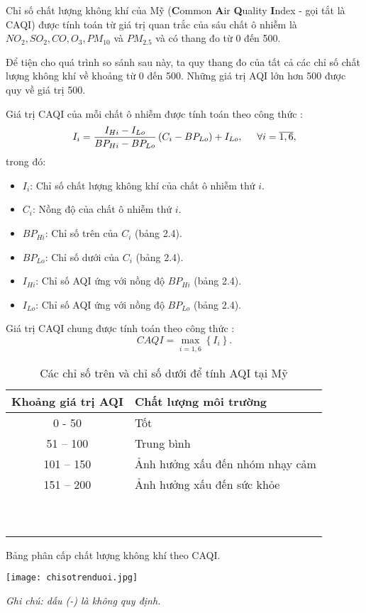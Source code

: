\documentclass[14pt]{extreport}
\theoremstyle{definition}
\theoremstyle{plain}
\theoremstyle{remark}
\begin{document}
Chỉ số chất lượng không khí của Mỹ (\textbf{C}ommon \textbf{A}ir \textbf{Q}uality \textbf{I}ndex - gọi tắt là CAQI) được tính toán từ giá trị quan trắc của sáu chất ô nhiễm là $NO_2, SO_2, CO, O_3, PM_{10}$ và $PM_{2.5}$ và có thang đo từ 0 đến 500. 

Để tiện cho quá trình so sánh sau này, ta quy thang đo của tất cả các chỉ số chất lượng không khí về khoảng từ 0 đến 500. Những giá trị AQI lớn hơn 500 được quy về giá trị 500.

Giá trị CAQI của mỗi chất ô nhiễm được tính toán theo công thức \cite{USEPA2013}:
\begin{equation}
I_i = \dfrac{I_{Hi} - I_{Lo}}{BP_{Hi} - BP_{Lo}}\left(C_i - BP_{Lo}\right) + I_{Lo},\hspace{0.5cm} \forall i=\overline{1,6},
\end{equation}
trong đó:	
\begin{itemize}
\item $I_i$: Chỉ số chất lượng không khí của chất ô nhiễm thứ $i$.
\item $C_i$: Nồng độ của chất ô nhiễm thứ $i$.
\item $BP_{Hi}$: Chỉ số trên của $C_i$ (bảng 2.4).
\item $BP_{Lo}$: Chỉ số dưới của $C_i$ (bảng 2.4).
\item $I_{Hi}$: Chỉ số AQI ứng với nồng độ $BP_{Hi}$ (bảng 2.4).
\item $I_{Lo}$: Chỉ số AQI ứng với nồng độ $BP_{Lo}$ (bảng 2.4).
\end{itemize}

Giá trị CAQI chung được tính toán theo công thức \cite{USEPA2013}:
\begin{equation}
CAQI = \max_{i=\overline{1,6}} \left\lbrace I_i  \right\rbrace.
\end{equation}

\begin{table}
\begin{tabular}{|c|p{10.8cm}|} 
 \hline
 Khoảng giá trị AQI & \hspace{2.5cm}Chất lượng môi trường\hspace{3cm}\\
 \hline \hline \rowcolor{green}
 0 - 50 & Tốt\\\rowcolor{yellow}
 51 – 100  & Trung bình\\\rowcolor{orange}
 101 – 150	& 	Ảnh hưởng xấu đến nhóm nhạy cảm \\\rowcolor{red}
 151 – 200  &	Ảnh hưởng xấu đến sức khỏe\\\rowcolor{purple}  
 \textcolor{white}{201 – 300}	& 	 \textcolor{white}{Ảnh hưởng rất xấu đến sức khỏe} \\\rowcolor{maroon}
 \textcolor{white}{301 – 500} 	& 	 \textcolor{white}{Nguy hiểm}\\
 \hline
\end{tabular}
\caption{Bảng phân cấp chất lượng không khí theo CAQI.}

\begin{center}
\texttt{[image: chisotrenduoi.jpg]}
\end{center}
\caption{Các chỉ số trên và chỉ số dưới để tính AQI tại Mỹ}
\textit{\small{Ghi chú: dấu (-) là không quy định.}}
\end{table}
\end{document}
